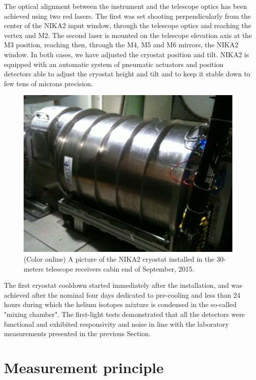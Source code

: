 \documentclass[]{aa} %
\begin{document}
The optical alignment between the instrument and the telescope optics has been achieved using two red lasers. The first was set shooting perpendicularly from the center of the NIKA2 input window, through the telescope optics and reaching the vertex and M2. The second laser is mounted on the telescope elevation axis at the M3 position, reaching then, through the M4, M5 and M6 mirrors, the NIKA2 window. In both cases, we have adjusted the cryostat position and tilt. NIKA2 is equipped with an automatic system of pneumatic actuators and position detectors able to adjust the cryostat height and tilt and to keep it stable down to few tens of microns precision. 

\begin{figure}[h]
   \centering
    \includegraphics[width=.85\linewidth]{NIKA2cryo.jpg}
      \caption{(Color online) A picture of the NIKA2 cryostat installed in the 30-meters telescope receivers cabin end of September, 2015.}
         \label{Fig5}
\end{figure}

The first cryostat cooldown started immediately after the installation, and was achieved after the nominal four days dedicated to pre-cooling and less than 24 hours during which the helium isotopes mixture is condensed in the so-called "mixing chamber". The first-light tests demonstrated that all the detectors were functional and exhibited responsivity and noise in line with the laboratory measurements presented in the previous Section. 


\section{Measurement principle}
\label{Measurement principle}
\end{document}
